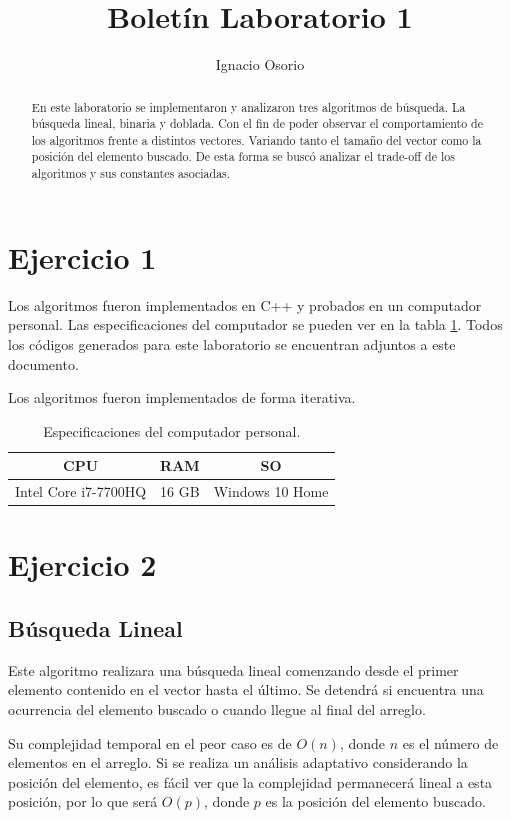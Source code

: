 \documentclass[]{article}
\title{Boletín Laboratorio 1}
\author{Ignacio Osorio}
\begin{document}
\maketitle

\begin{abstract}
En este laboratorio se implementaron y analizaron tres algoritmos de búsqueda. La búsqueda lineal, binaria y doblada. Con el fin de poder observar el comportamiento de los algoritmos frente a distintos vectores. Variando tanto el tamaño del vector como la posición del elemento buscado. De esta forma se buscó analizar el trade-off de los algoritmos y sus constantes asociadas.
\end{abstract}

\section{Ejercicio 1}

Los algoritmos fueron implementados en C++ y probados en un computador personal. Las especificaciones del computador se pueden ver en la tabla \ref{tab:spec}. Todos los códigos generados para este laboratorio se encuentran adjuntos a este documento.

Los algoritmos fueron implementados de forma iterativa.

\begin{table}[]
	\centering
	\caption{Especificaciones del computador personal.}
	\label{tab:spec}
	\begin{tabular}{|c|c|c|}
		\hline
		CPU 					& RAM 			& SO 	 				\\ \hline
		Intel Core i7-7700HQ    & 16 GB        	& Windows 10 Home        \\ \hline
	\end{tabular}
\end{table}


\section{Ejercicio 2}
\subsection{Búsqueda Lineal}

Este algoritmo realizara una búsqueda lineal comenzando desde el primer elemento contenido en el vector hasta el último. Se detendrá si encuentra una ocurrencia del elemento buscado o cuando llegue al final del arreglo.

Su complejidad temporal en el peor caso es de $O(n)$, donde $n$ es el número de elementos en el arreglo. Si se realiza un análisis adaptativo considerando la posición del elemento, es fácil ver que la complejidad permanecerá lineal a esta posición, por lo que será $O(p)$, donde $p$ es la posición del elemento buscado.
\end{document}
